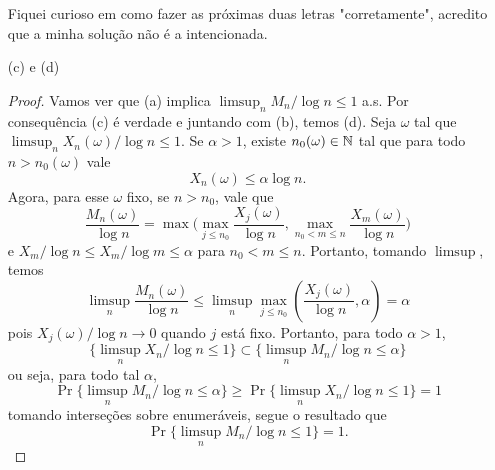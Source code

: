 \begin{enumerate}[label=(\alph*)]
		Fiquei curioso em como fazer as próximas duas letras
		"corretamente", acredito que a minha solução não é a intencionada.
	\item[(c) e (d)]
		\begin{proof}
			Vamos ver que (a) implica $\limsup_n M_n/\log n \leq 1$ a.s. Por
			consequência (c) é verdade e juntando com (b), temos (d).
			Seja $\omega$ tal que $\limsup_n X_n(\omega)/\log n \leq 1$. Se
			$\alpha > 1$, existe $n_0(\omega) \in \mathbb{N}$ tal que para
			todo $n > n_0(\omega)$ vale
			\[
				X_n(\omega) \leq \alpha \log n.
			\]
			Agora, para esse $\omega$ fixo, se $n > n_0$, vale que
			\[
				\frac{M_n(\omega)}{\log n} = \max\bigg( \max_{j \leq n_0}
					\frac{X_j(\omega)}{\log n},  \max_{n_0 < m \leq
				n}\frac{X_m(\omega)}{\log n} \bigg)
			\]
			e $X_m/\log n \leq X_m/\log m \leq \alpha$ para $n_0 < m \leq n$.
			Portanto, tomando $\limsup$, temos
			\[
				\limsup_n \frac{M_n(\omega)}{\log n} \leq \limsup_n \max_{j \leq n_0}
				(\frac{X_j(\omega)}{\log n}, \alpha) = \alpha
			\]
			pois $X_j(\omega)/\log n \to 0$ quando $j$ está fixo. Portanto,
			para todo $\alpha > 1$,
			\[
				\{\limsup_n X_n/\log n \leq 1\} \subset \{\limsup_n M_n/\log n
				\leq \alpha\}
			\]
			ou seja, para todo tal $\alpha$,
			\[
				\Pr\{\limsup_n M_n/\log n \leq \alpha\} \geq \Pr\{\limsup_n
				X_n/\log n \leq 1\} = 1
			\]
			tomando interseções sobre enumeráveis, segue o resultado que
			\[
				\Pr\{\limsup_n M_n/\log n \leq 1\} = 1.
			\]
		\end{proof}
\end{enumerate}

